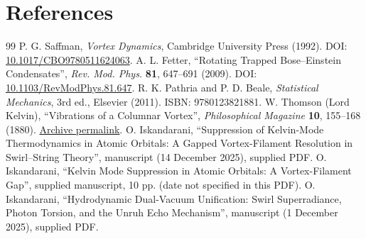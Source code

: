 \documentclass[10pt,a4paper]{article}
\begin{document}
\section*{References}
\begin{thebibliography}{99}
 P. G. Saffman, \emph{Vortex Dynamics}, Cambridge University Press (1992). DOI: \href{https://doi.org/10.1017/CBO9780511624063}{10.1017/CBO9780511624063}.
 A. L. Fetter, ``Rotating Trapped Bose--Einstein Condensates'', \emph{Rev. Mod. Phys.} \textbf{81}, 647--691 (2009). DOI: \href{https://doi.org/10.1103/RevModPhys.81.647}{10.1103/RevModPhys.81.647}.
 R. K. Pathria and P. D. Beale, \emph{Statistical Mechanics}, 3rd ed., Elsevier (2011). ISBN: 9780123821881.
 W. Thomson (Lord Kelvin), ``Vibrations of a Columnar Vortex'', \emph{Philosophical Magazine} \textbf{10}, 155--168 (1880). \href{https://archive.org/details/philosophicalmag10lond}{Archive permalink}.
 O. Iskandarani, ``Suppression of Kelvin-Mode Thermodynamics in Atomic Orbitals: A Gapped Vortex-Filament Resolution in Swirl--String Theory'', manuscript (14 December 2025), supplied PDF.
 O. Iskandarani, ``Kelvin Mode Suppression in Atomic Orbitals: A Vortex-Filament Gap'', supplied manuscript, 10 pp. (date not specified in this PDF).
 O. Iskandarani, ``Hydrodynamic Dual-Vacuum Unification: Swirl Superradiance, Photon Torsion, and the Unruh Echo Mechanism'', manuscript (1 December 2025), supplied PDF.
\end{thebibliography}
\end{document}

